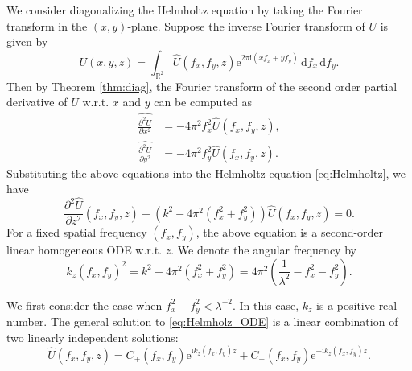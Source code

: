 \documentclass[12pt]{article}
\begin{document}
We consider diagonalizing the Helmholtz equation by taking the Fourier transform in the \( (x, y) \)-plane.
Suppose the inverse Fourier transform of \(U\) is given by
\[
    U(x, y, z) = \int_{\mathbb{R}^2} \hat{U}(f_x, f_y, z) \mathrm{e}^{2\pi \mathrm{i} (x f_x + y f_y)}\,
    \mathrm{d}f_x \, \mathrm{d}f_y.
\]
Then by Theorem \ref{thm:diag}, the Fourier transform of the second order partial derivative of 
\(U\) w.r.t. \( x \) and \( y \) can be computed as
\begin{align*}
    \widehat{\frac{\partial^2 U}{\partial x^2}} & = -4\pi^2 f_x^2 \hat{U}(f_x, f_y, z), \\
    \widehat{\frac{\partial^2 U}{\partial y^2}} & = -4\pi^2 f_y^2 \hat{U}(f_x, f_y, z).
\end{align*}
Substituting the above equations into the Helmholtz equation \eqref{eq:Helmholtz}, we have
\begin{equation*} \label{eq:Helmholz_ODE}
    \frac{\partial^2 \hat{U}}{\partial z^2} (f_x, f_y, z) + (k^2 - 4\pi^2 (f_x^2 + f_y^2)) 
    \hat{U}(f_x, f_y, z) = 0.
\end{equation*}
For a fixed spatial frequency \( (f_x, f_y) \), the above equation is a second-order linear homogeneous 
ODE w.r.t. \( z \). We denote the angular frequency by
\[
    k_z(f_x, f_y)^2 = k^2 - 4\pi^2 (f_x^2 + f_y^2) = 4 \pi^2 \left( \frac{1}{\lambda^2} - f_x^2 - f_y^2 \right).
\]

We first consider the case when \( f_x^2 + f_y^2 < \lambda^{-2} \). In this case, \( k_z \) is a 
positive real number.
The general solution to \eqref{eq:Helmholz_ODE} is a linear combination of two linearly independent solutions:
\[
    \hat{U}(f_x, f_y, z) = C_+(f_x, f_y) \mathrm{e}^{\mathrm{i} k_z(f_x, f_y) z} + 
    C_-(f_x, f_y) \mathrm{e}^{-\mathrm{i} k_z(f_x, f_y) z}.
\]
\end{document}
